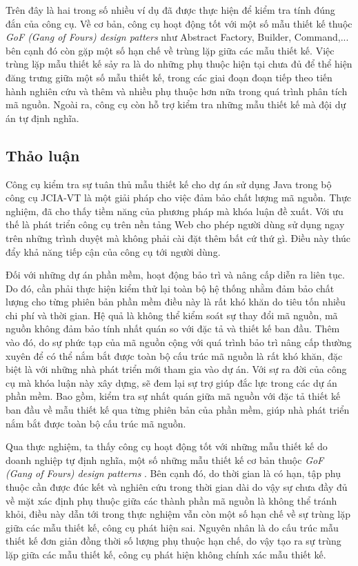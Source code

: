 \documentclass[12pt]{report}
\begin{document}
\noindent Trên đây là hai trong số nhiều ví dụ đã được thực hiện để kiểm tra tính đúng đắn của công cụ. Về cơ bản, công cụ hoạt động tốt với một số mẫu thiết kế thuộc \textit{GoF (Gang of Fours) design patters} \cite{go4} như Abstract Factory, Builder, Command,... bên cạnh đó còn gặp một số hạn chế về trùng lặp giữa các mẫu thiết kế. Việc trùng lặp mẫu thiết kế sảy ra là do những phụ thuộc hiện tại chưa đủ để thể hiện đăng trưng giữa một số mẫu thiết kế, trong các giai đoạn đoạn tiếp theo tiến hành nghiên cứu và thêm và nhiều phụ thuộc hơn nữa trong quá trình phân tích mã nguồn.
Ngoài ra, công cụ còn hỗ trợ kiểm tra những mẫu thiết kế mà đội dự án tự định nghĩa.

\subsection{Thảo luận}
Công cụ kiểm tra sự tuân thủ mẫu thiết kế cho dự án sử dụng Java trong bộ công cụ JCIA-VT là một giải pháp cho việc đảm bảo chất lượng mã nguồn. Thực nghiệm, đã cho thấy tiềm năng của phương pháp mà khóa luận đề xuất. Với ưu thế là phát triển công cụ trên nền tảng Web cho phép người dùng sử dụng ngay trên những trình duyệt mà không phải cài đặt thêm bất cứ thứ gì. Điều này thúc đẩy khả năng tiếp cận của công cụ tới người dùng.

\noindent Đối với những dự án phần mềm, hoạt động bảo trì và nâng cấp diễn ra liên tục. Do đó, cần phải thực hiện kiểm thử lại toàn bộ hệ thống nhằm đảm bảo chất lượng cho từng phiên bản phần mềm điều này là rất khó khăn do tiêu tốn nhiều chi phí và thời gian. Hệ quả là không thể kiểm soát sự thay đổi mã nguồn, mã nguồn không đảm bảo tính nhất quán so với đặc tả và thiết kế ban đầu. Thêm vào đó, do sự phức tạp của mã nguồn cộng với quá trình bảo trì nâng cấp thường xuyên để có thể nắm bắt được toàn bộ cấu trúc mã nguồn là rất khó khăn, đặc biệt là với những nhà phát triển mới tham gia vào dự án. Với sự ra đời của công cụ mà khóa luận này xây dựng, sẽ đem lại sự trợ giúp đắc lực trong các dự án phần mềm. Bao gồm, kiểm tra sự nhất quán giữa mã nguồn với đặc tả thiết kế ban đầu về mẫu thiết kế qua từng phiên bản của phần mềm, giúp nhà phát triển nắm bắt được toàn bộ cấu trúc mã nguồn.

\noindent Qua thực nghiệm, ta thấy công cụ hoạt động tốt với những mẫu thiết kế do doanh nghiệp tự định nghĩa, một số những mẫu thiết kế cơ bản thuộc \textit{GoF (Gang of Fours) design patterns} \cite{go4}. Bên cạnh đó, do thời gian là có hạn, tập phụ thuộc cần được đúc kết và nghiên cứu trong thời gian dài do vậy sự chưa đầy đủ về mặt xác định phụ thuộc giữa các thành phần mã nguồn là không thể tránh khỏi, điều này dẫn tới trong thực nghiệm vẫn còn một số hạn chế về sự trùng lặp giữa các mẫu thiết kế, công cụ phát hiện sai. Nguyên nhân là do cấu trúc mẫu thiết kế đơn giản đồng thời số lượng phụ thuộc hạn chế, do vậy tạo ra sự trùng lặp giữa các mẫu thiết kế, công cụ phát hiện không chính xác mẫu thiết kế.
\end{document}
